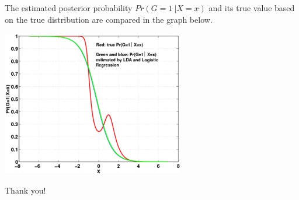 \documentclass[12pt,notes,mathserif]{beamer}
\newcommand{\chuhao}{\fontsize{44.9pt}{\baselineskip}\selectfont}
\begin{document}
\begin{frame}[c]
	\frametitle{}
	The estimated posterior probability $Pr(G = 1~| X = x)$ and its true value based on the true distribution are compared in the graph below.
	\begin{center}
		\includegraphics[width=0.6\textwidth]{lec12-44.jpg}
	\end{center}
\end{frame}
\begin{frame}
	\begin{center}
		\chuhao Thank you! %
	\end{center}
\end{frame}
\end{document}
